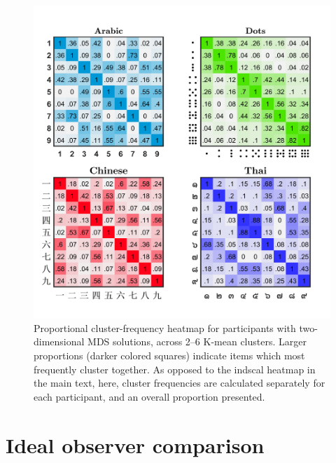 \begin{figure}[tbh]
\centering \includegraphics[scale = .7]{Figures/Appendix/AppE/Participant_2D_KM.jpg}
\caption{Proportional cluster-frequency heatmap for participants with two-dimensional MDS solutions, across 2--6 K-mean clusters. Larger proportions (darker colored squares) indicate items which most frequently cluster together. As opposed to the indscal heatmap in the main text, here, cluster frequencies are calculated separately for each participant, and an overall proportion presented.}
\label{fig:Apx_2Dheatmap_Cross}
\end{figure}

\clearpage
\section{Ideal observer comparison}
\label{Appendix:IOA}

